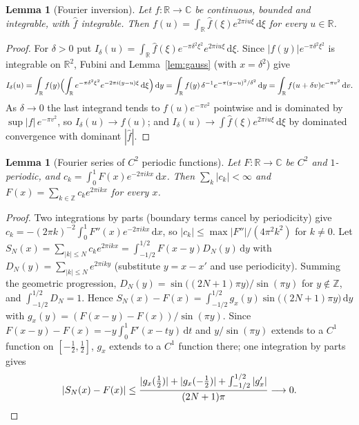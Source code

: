 \documentclass[11pt]{article}
\newtheorem{lemma}[theorem]{Lemma}
\theoremstyle{definition}
\newcommand{\C}{\mathbb{C}}
\newcommand{\R}{\mathbb{R}}
\newcommand{\Z}{\mathbb{Z}}
\newcommand{\dd}{\,\mathrm{d}}
\begin{document}
\begin{lemma}[Fourier inversion]\label{lem:inversion}
Let $f:\R\to\C$ be continuous, bounded and integrable, with $\widehat f$ integrable. Then $f(u)=\int_\R\widehat f(\xi)e^{2\pi iu\xi}\dd\xi$ for every $u\in\R$.
\end{lemma}
\begin{proof}
For $\delta>0$ put $I_\delta(u)=\int_\R\widehat f(\xi)e^{-\pi\delta^{2}\xi^{2}}e^{2\pi iu\xi}\dd\xi$. Since $|f(y)|e^{-\pi\delta^{2}\xi^{2}}$ is integrable on $\R^{2}$, Fubini and Lemma~\ref{lem:gauss} (with $x=\delta^{2}$) give
\[
I_\delta(u)=\int_\R f(y)\Bigl(\int_\R e^{-\pi\delta^{2}\xi^{2}}e^{-2\pi i(y-u)\xi}\dd\xi\Bigr)\dd y
=\int_\R f(y)\,\delta^{-1}e^{-\pi(y-u)^{2}/\delta^{2}}\dd y=\int_\R f(u+\delta v)e^{-\pi v^{2}}\dd v .
\]
As $\delta\to0$ the last integrand tends to $f(u)e^{-\pi v^{2}}$ pointwise and is dominated by $\sup|f|\,e^{-\pi v^{2}}$, so $I_\delta(u)\to f(u)$; and $I_\delta(u)\to\int\widehat f(\xi)e^{2\pi iu\xi}\dd\xi$ by dominated convergence with dominant $|\widehat f|$.
\end{proof}

\begin{lemma}[Fourier series of $C^{2}$ periodic functions]\label{lem:fourier-series}
Let $F:\R\to\C$ be $C^{2}$ and $1$-periodic, and $c_k=\int_0^1F(x)e^{-2\pi ikx}\dd x$. Then $\sum_k|c_k|<\infty$ and $F(x)=\sum_{k\in\Z}c_ke^{2\pi ikx}$ for every $x$.
\end{lemma}
\begin{proof}
Two integrations by parts (boundary terms cancel by periodicity) give $c_k=-(2\pi k)^{-2}\int_0^1F''(x)e^{-2\pi ikx}\dd x$, so $|c_k|\le\max|F''|/(4\pi^{2}k^{2})$ for $k\ne0$.
Let $S_N(x)=\sum_{|k|\le N}c_ke^{2\pi ikx}=\int_{-1/2}^{1/2}F(x-y)D_N(y)\dd y$ with $D_N(y)=\sum_{|k|\le N}e^{2\pi iky}$ (substitute $y=x-x'$ and use periodicity).
Summing the geometric progression, $D_N(y)=\sin\bigl((2N+1)\pi y\bigr)/\sin(\pi y)$ for $y\notin\Z$, and $\int_{-1/2}^{1/2}D_N=1$.
Hence $S_N(x)-F(x)=\int_{-1/2}^{1/2}g_x(y)\sin\bigl((2N+1)\pi y\bigr)\dd y$ with $g_x(y)=(F(x-y)-F(x))/\sin(\pi y)$.
Since $F(x-y)-F(x)=-y\int_0^1F'(x-ty)\dd t$ and $y/\sin(\pi y)$ extends to a $C^{1}$ function on $[-\tfrac12,\tfrac12]$, $g_x$ extends to a $C^{1}$ function there; one integration by parts gives
\[
|S_N(x)-F(x)|\le\frac{|g_x(\tfrac12)|+|g_x(-\tfrac12)|+\int_{-1/2}^{1/2}|g_x'|}{(2N+1)\pi}\longrightarrow0 .\qedhere
\]
\end{proof}
\end{document}
